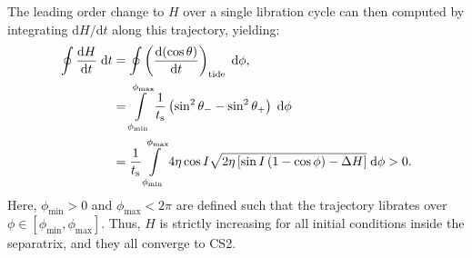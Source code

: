 \documentclass[
        fleqn,
        usenatbib,
    ]{mnras}
\newcommand*{\rd}[2]{\frac{\mathrm{d}#1}{\mathrm{d}#2}}
\newcommand*{\pd}[2]{\frac{\partial#1}{\partial#2}}
\newcommand*{\rdil}[2]{\mathrm{d}#1/\mathrm{d}#2}
\newcommand*{\p}[1]{\left(#1\right)}
\newcommand*{\s}[1]{\left[#1\right]}
\begin{document}
The leading order change to $H$ over a single libration cycle can then computed by
integrating $\rdil{H}{t}$ along this trajectory, yielding:
\begin{align}
    \oint \rd{H}{t}\;\mathrm{d}t
        &= \oint \p{\rd{(\cos \theta)}{t}}_{\rm tide}
            \;\mathrm{d}\phi,\nonumber\\
        &= \int\limits_{\phi_{\min}}^{\phi_{\max}}
                \frac{1}{t_{\rm s}}
                \p{\sin^2\theta_- - \sin^2\theta_+} \;\mathrm{d}\phi\nonumber\\
        &= \frac{1}{t_{\rm s}}
            \int\limits_{\phi_{\min}}^{\phi_{\max}}
                4\eta \cos I \sqrt{2\eta\s{\sin I\p{1 - \cos \phi} - \Delta H}}
                \;\mathrm{d}\phi > 0.
\end{align}
Here, $\phi_{\min} > 0$ and $\phi_{\max} < 2\pi$ are defined such that the
trajectory librates over $\phi \in \s{\phi_{\min}, \phi_{\max}}$. Thus, $H$ is
strictly increasing for all initial conditions inside the separatrix, and they
all converge to CS2.



\end{document}
